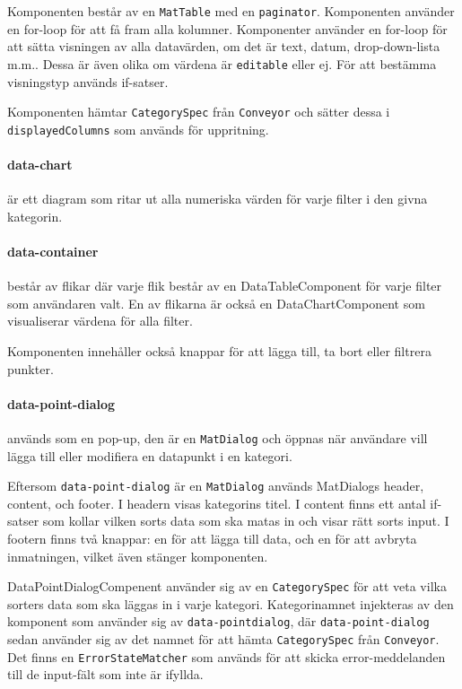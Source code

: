 \documentclass[techdoc/techdock.tex]{subfiles}
\begin{document}
Komponenten består av en \texttt{MatTable} med en \texttt{paginator}.
Komponenten använder en for-loop för att få fram alla kolumner. Komponenter
använder en for-loop för att sätta visningen av alla datavärden, om det är
text, datum, drop-down-lista m.m.. Dessa är även olika om värdena är
\texttt{editable} eller ej. För att bestämma visningstyp används if-satser.

Komponenten hämtar \texttt{CategorySpec} från \texttt{Conveyor} och sätter
dessa i \texttt{displayedColumns} som används för uppritning.

\paragraph{data-chart}
är ett diagram som ritar ut alla numeriska värden för varje filter i den givna
kategorin.

\paragraph{data-container}
består av flikar där varje flik består av en DataTableComponent för varje
filter som användaren valt. En av flikarna är också en DataChartComponent som
visualiserar värdena för alla filter.

Komponenten innehåller också knappar för att lägga till, ta bort eller filtrera
punkter.

\paragraph{data-point-dialog} används som en pop-up, den är en
\texttt{MatDialog} och öppnas när användare vill lägga till eller modifiera en
datapunkt i en kategori.

Eftersom \texttt{data-point-dialog} är en \texttt{MatDialog} används MatDialogs
header, content, och footer. I headern visas kategorins titel. I content finns
ett antal if-satser som kollar vilken sorts data som ska matas in och visar
rätt sorts input. I footern finns två knappar: en för att lägga till data, och
en för att avbryta inmatningen, vilket även stänger komponenten.

DataPointDialogCompenent använder sig av en \texttt{CategorySpec} för att veta
vilka sorters data som ska läggas in i varje kategori. Kategorinamnet injekteras
av den komponent som använder sig av \texttt{data-point\-dialog}, där
\texttt{data-point-dialog} sedan använder sig av det namnet för att hämta
\texttt{CategorySpec} från \texttt{Conveyor}. Det finns en
\texttt{ErrorStateMatcher} som används för att skicka error-meddelanden till de
input-fält som inte är ifyllda.
\end{document}
